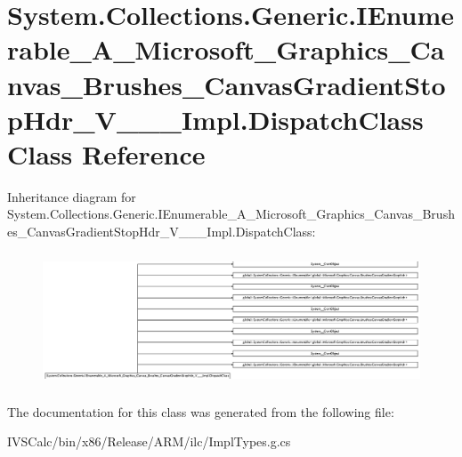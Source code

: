 \hypertarget{class_system_1_1_collections_1_1_generic_1_1_i_enumerable___a___microsoft___graphics___canvas___4092ec46bc2d905ad6e397a8f6b7e578}{}\section{System.\+Collections.\+Generic.\+I\+Enumerable\+\_\+\+A\+\_\+\+Microsoft\+\_\+\+Graphics\+\_\+\+Canvas\+\_\+\+Brushes\+\_\+\+Canvas\+Gradient\+Stop\+Hdr\+\_\+\+V\+\_\+\+\_\+\+\_\+\+Impl.\+Dispatch\+Class Class Reference}
\label{class_system_1_1_collections_1_1_generic_1_1_i_enumerable___a___microsoft___graphics___canvas___4092ec46bc2d905ad6e397a8f6b7e578}
Inheritance diagram for System.\+Collections.\+Generic.\+I\+Enumerable\+\_\+\+A\+\_\+\+Microsoft\+\_\+\+Graphics\+\_\+\+Canvas\+\_\+\+Brushes\+\_\+\+Canvas\+Gradient\+Stop\+Hdr\+\_\+\+V\+\_\+\+\_\+\+\_\+\+Impl.\+Dispatch\+Class\+:\begin{figure}[H]
\begin{center}
\leavevmode
\includegraphics[height=3.984476cm]{class_system_1_1_collections_1_1_generic_1_1_i_enumerable___a___microsoft___graphics___canvas___4092ec46bc2d905ad6e397a8f6b7e578}
\end{center}
\end{figure}


The documentation for this class was generated from the following file\+:\begin{DoxyCompactItemize}
\item 
I\+V\+S\+Calc/bin/x86/\+Release/\+A\+R\+M/ilc/Impl\+Types.\+g.\+cs\end{DoxyCompactItemize}
